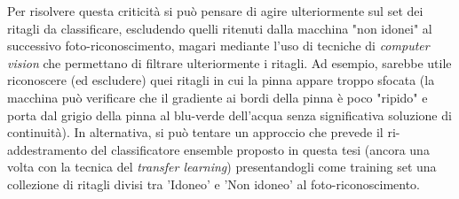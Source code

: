 Per risolvere questa criticità si può pensare di agire ulteriormente sul set dei ritagli da classificare, escludendo quelli ritenuti dalla macchina "non idonei" al successivo foto-riconoscimento, magari mediante l'uso di tecniche di \textit{computer vision} che permettano di filtrare ulteriormente i ritagli. Ad esempio, sarebbe utile riconoscere (ed escludere) quei ritagli in cui la pinna appare troppo sfocata (la macchina può verificare che il gradiente ai bordi della pinna è poco "ripido" e porta dal grigio della pinna al blu-verde dell'acqua senza significativa soluzione di continuità).
In alternativa, si può tentare un approccio che prevede il ri-addestramento del classificatore ensemble proposto in questa tesi (ancora una volta con la tecnica del \textit{transfer learning}) presentandogli come training set una collezione di ritagli divisi tra 'Idoneo' e 'Non idoneo' al foto-riconoscimento.\\

